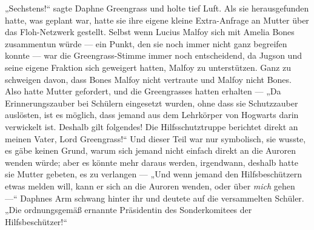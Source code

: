 „Sechstens!“ sagte Daphne Greengrass und holte tief Luft. Als sie herausgefunden hatte, was geplant war, hatte sie ihre eigene kleine Extra-Anfrage an Mutter über das Floh-Netzwerk gestellt. Selbst wenn Lucius Malfoy sich mit Amelia Bones zusammentun würde — ein Punkt, den sie noch immer nicht ganz begreifen konnte — war die Greengrass-Stimme immer noch entscheidend, da Jugson und seine eigene Fraktion sich geweigert hatten, Malfoy zu unterstützen. Ganz zu schweigen davon, dass Bones Malfoy nicht vertraute und Malfoy nicht Bones. Also hatte Mutter gefordert, und die Greengrasses hatten erhalten —
„Da Erinnerungszauber bei Schülern eingesetzt wurden, ohne dass sie Schutzzauber auslösten, ist es möglich, dass jemand aus dem Lehrkörper von Hogwarts darin verwickelt ist. Deshalb gilt folgendes! Die Hilfsschutztruppe berichtet direkt an meinen Vater, Lord Greengrass!“
Und dieser Teil war nur symbolisch, sie wusste, es gäbe keinen Grund, warum sich jemand nicht einfach direkt an die Auroren wenden würde; aber es könnte mehr daraus werden, irgendwann, deshalb hatte sie Mutter gebeten, es zu verlangen —
„Und wenn jemand den Hilfsbeschützern etwas melden will, kann er sich an die Auroren wenden, oder über \emph{mich} gehen —“
Daphnes Arm schwang hinter ihr und deutete auf die versammelten Schüler.
„Die ordnungsgemäß ernannte Präsidentin des Sonderkomitees der Hilfsbeschützer!“

